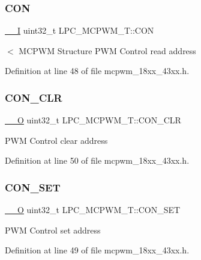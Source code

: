 \subsubsection{\texorpdfstring{C\+ON}{CON}}
{\footnotesize\ttfamily \hyperlink{core__sc300_8h_af63697ed9952cc71e1225efe205f6cd3}{\+\_\+\+\_\+I} uint32\+\_\+t L\+P\+C\+\_\+\+M\+C\+P\+W\+M\+\_\+\+T\+::\+C\+ON}

$<$ M\+C\+P\+WM Structure P\+WM Control read address 

Definition at line 48 of file mcpwm\+\_\+18xx\+\_\+43xx.\+h.

\mbox{\label{struct_l_p_c___m_c_p_w_m___t_a22b564b847caa28e9f0c53ff38375cc3}} 
\subsubsection{\texorpdfstring{C\+O\+N\+\_\+\+C\+LR}{CON\_CLR}}
{\footnotesize\ttfamily \hyperlink{core__sc300_8h_a7e25d9380f9ef903923964322e71f2f6}{\+\_\+\+\_\+O} uint32\+\_\+t L\+P\+C\+\_\+\+M\+C\+P\+W\+M\+\_\+\+T\+::\+C\+O\+N\+\_\+\+C\+LR}

P\+WM Control clear address 

Definition at line 50 of file mcpwm\+\_\+18xx\+\_\+43xx.\+h.

\mbox{\label{struct_l_p_c___m_c_p_w_m___t_a3dc36e144bb33d1756f06c765726f15d}} 
\subsubsection{\texorpdfstring{C\+O\+N\+\_\+\+S\+ET}{CON\_SET}}
{\footnotesize\ttfamily \hyperlink{core__sc300_8h_a7e25d9380f9ef903923964322e71f2f6}{\+\_\+\+\_\+O} uint32\+\_\+t L\+P\+C\+\_\+\+M\+C\+P\+W\+M\+\_\+\+T\+::\+C\+O\+N\+\_\+\+S\+ET}

P\+WM Control set address 

Definition at line 49 of file mcpwm\+\_\+18xx\+\_\+43xx.\+h.

